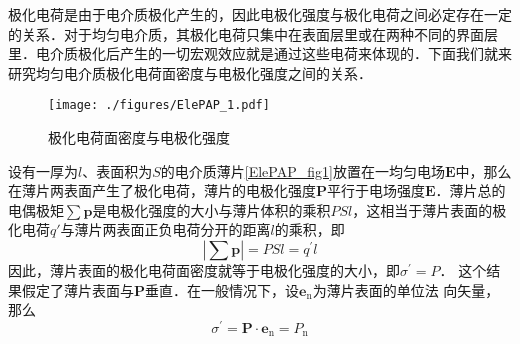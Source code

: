 

极化电荷是由于电介质极化产生的，因此电极化强度与极化电荷之间必定存在一定的关系．对于均匀电介质，其极化电荷只集中在表面层里或在两种不同的界面层里．电介质极化后产生的一切宏观效应就是通过这些电荷来体现的．下面我们就来研究均匀电介质极化电荷面密度与电极化强度之间的关系．

\begin{figure}[ht]
\centering
\texttt{[image: ./figures/ElePAP\_1.pdf]}
\caption{极化电荷面密度与电极化强度} \label{ElePAP_fig1}
\end{figure}
设有一厚为$l$、表面积为$S $的电介质薄片\autoref{ElePAP_fig1}放置在一均匀电场$\mathbf E $中，那么在薄片两表面产生了极化电荷，薄片的电极化强度$\mathbf P $平行于电场强度$\mathbf E$．薄片总的电偶极矩$\sum \mathbf p$是电极化强度的大小与薄片体积的乘积$PSl$，这相当于薄片表面的极化电荷$q' $与薄片两表面正负电荷分开的距离$l $的乘积，即
\begin{equation}
\left|\sum \mathbf p\right|=P S l=q^{\prime} l
\end{equation}
因此，薄片表面的极化电荷面密度就等于电极化强度的大小，即$\sigma^{\prime}=P$．
这个结果假定了薄片表面与$\mathbf P $垂直．在一般情况下，设$\mathbf e_\mathrm{n} $为薄片表面的单位法
向矢量，那么
\begin{equation}
\sigma^{\prime}=\mathbf P \cdot \mathbf e_{\mathrm{n}}=P_{\mathrm{n}}
\end{equation}